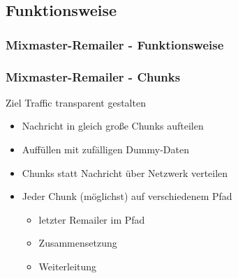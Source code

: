 \documentclass{beamer}
\begin{document}
\subsection{Funktionsweise}
\begin{frame}
	\frametitle{Mixmaster-Remailer - Funktionsweise}
	
\end{frame}

\begin{frame}
	\frametitle{Mixmaster-Remailer - Chunks}
	\begin{exampleblock}{Ziel}
		Traffic transparent gestalten
	\end{exampleblock}

	\begin{itemize}	
		\item Nachricht in gleich große Chunks aufteilen
		\item Auffüllen mit zufälligen Dummy-Daten
		\item Chunks statt Nachricht über Netzwerk verteilen
		\item Jeder Chunk (möglichst) auf verschiedenem Pfad
		\begin{itemize}
			\item letzter Remailer im Pfad
			\item Zusammensetzung
			\item Weiterleitung
		\end{itemize}	
	\end{itemize}	
\end{frame}
\end{document}
